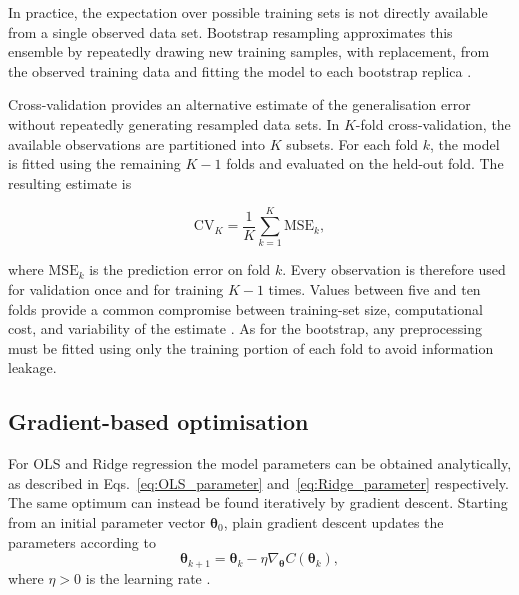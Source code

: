 \documentclass[aps,rmp,reprint,amsmath,amssymb,graphicx,longbibliography]{revtex4-1}
\begin{document}
In practice, the expectation over possible training sets is not directly
available from a single observed data set. Bootstrap resampling approximates
this ensemble by repeatedly drawing new training samples, with replacement,
from the observed training data and fitting the model to each bootstrap replica
\cite{HjorthJensen2026MLPSCh2}.

Cross-validation provides an alternative estimate of the generalisation error
without repeatedly generating resampled data sets. In $K$-fold
cross-validation, the available observations are partitioned into
$K$ subsets. For each fold $k$, the model is fitted using the remaining
$K-1$ folds and evaluated on the held-out fold. The resulting estimate is

\begin{equation}
    \mathrm{CV}_{K}
    =
    \frac{1}{K}
    \sum_{k=1}^{K}
    \mathrm{MSE}_{k},
\end{equation}

where $\mathrm{MSE}_{k}$ is the prediction error on fold $k$. Every
observation is therefore used for validation once and for training $K-1$
times. Values between five and ten folds provide a common compromise between
training-set size, computational cost, and variability of the estimate
\cite{HjorthJensen2026MLPSCh2}. As for the bootstrap, any preprocessing must
be fitted using only the training portion of each fold to avoid information
leakage.

\subsection{Gradient-based optimisation}
\label{subsec: Gradient-based optimisation}

For OLS and Ridge regression the model parameters can be obtained analytically,
as described in Eqs.~\eqref{eq:OLS_parameter} and~\eqref{eq:Ridge_parameter} respectively. The same optimum can instead be found
iteratively by gradient descent. Starting from an initial parameter vector
$\boldsymbol{\theta}_0$, plain gradient descent updates the parameters according
to
\begin{equation}
    \boldsymbol{\theta}_{k+1}
    =
    \boldsymbol{\theta}_k
    -
    \eta \nabla_{\boldsymbol{\theta}}
    C(\boldsymbol{\theta}_k),
\end{equation}
where $\eta>0$ is the learning rate
\cite{HjorthJensen2026MLPSCh4}.
\end{document}

